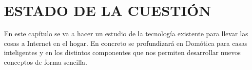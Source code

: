 \chapter{ESTADO DE LA CUESTIÓN}

En este capítulo se va a hacer un estudio de la tecnología existente para llevar las cosas a Internet en el hogar. En concreto se profundizará en Domótica para casas inteligentes y en los distintos componentes que nos permiten desarrollar nuevos conceptos de forma sencilla.







